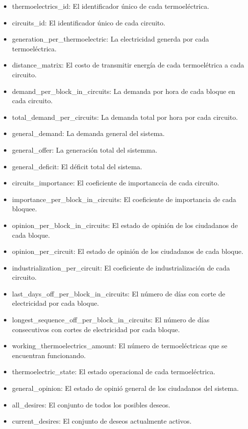 \documentclass[twocolumn, fontsize=10pt]{article}
\begin{document}
\begin{itemize}
    \item thermoelectrics\_id: El identificador único de cada termoeléctrica.
            \item circuits\_id: El identificador único de cada circuito.
            \item generation\_per\_thermoelectric: La electricidad generda por cada termoeléctrica.
            \item distance\_matrix: El costo de transmitir energía de cada termoelétrica a cada circuito.
            \item demand\_per\_block\_in\_circuits: La demanda por hora de cada bloque en cada circuito.
            \item total\_demand\_per\_circuits: La demanda total por hora por cada circuito.
            \item general\_demand: La demanda general del sistema.
            \item general\_offer: La generación total del sistemma.
            \item general\_deficit: El déficit total del sistema.
            \item circuits\_importance: El coeficiente de importanccia de cada circuito.
            \item importance\_per\_block\_in\_circuits: El coeficiente de importancia de cada bloquee.
            \item opinion\_per\_block\_in\_circuits: El estado de opinión de los ciudadanos de cada bloque.
            \item opinion\_per\_circuit: El estado de opinión de los ciudadanos de cada bloque.
            \item industrialization\_per\_circuit: El coeficiente de industrialización de cada circuito.
            \item last\_days\_off\_per\_block\_in\_circuits: El número de días con corte de electricidad por cada bloque.
            \item longest\_sequence\_off\_per\_block\_in\_circuits: El número de días consecutivos con cortes de electricidad por cada bloque.
            \item working\_thermoelectrics\_amount: El número de termoeléctricas que se encuentran funcionando.
            \item thermoelectric\_state: El estado operacional de cada termoeléctrica.
            \item general\_opinion:  El estado de opinió general de los ciudadanos del sistema.
            \item all\_desires: El conjunto de todos los posibles deseos.
            \item current\_desires: El conjunto de deseos actualmente activos.
\end{itemize}
\end{document}
